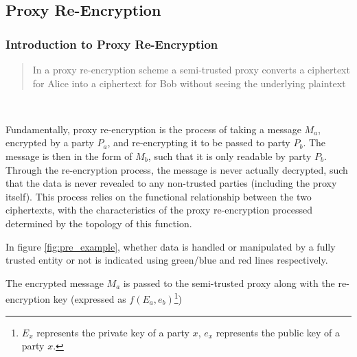 \subsection{Proxy Re-Encryption}

\subsubsection{Introduction to Proxy Re-Encryption}

\blockquote{In a proxy re-encryption scheme a semi-trusted proxy converts a ciphertext for Alice into a ciphertext for Bob without seeing the underlying plaintext}~\autocite{greenateniese:2006:article}

Fundamentally, proxy re-encryption is the process of taking a message $M_a$, encrypted by a party $P_a$, and re-encrypting it to be passed to party $P_b$. The message is then in the form of $M_b$, such that it is only readable by party $P_b$. Through the re-encryption process, the message is never actually decrypted, such that the data is never revealed to any non-trusted parties (including the proxy itself). This process relies on the functional relationship between the two ciphertexts, with the characteristics of the proxy re-encryption processed determined by the topology of this function.



In figure \ref{fig:pre_example}, whether data is handled or manipulated by a fully trusted entity or not is indicated using green/blue and red lines respectively.

The encrypted message $M_a$ is passed to the semi-trusted proxy along with the re-encryption key (expressed as $f(E_a, e_b)$\footnote{$E_x$ represents the private key of a party $x$, $e_x$ represents the public key of a party $x$.})



